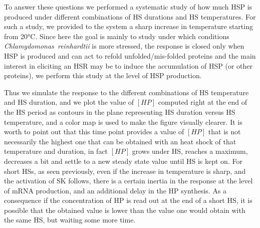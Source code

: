 \documentclass[oneside, 10pt, a4paper, twocolumn]{article}
\begin{document}
To answer these questions we performed a systematic study of how much HSP is produced under different combinations of HS durations and HS temperatures. 
For such a study, we provided to the system a sharp increase in temperature starting from 20°C. 
Since here the goal is mainly to study under which conditions \emph{Chlamydomonas~reinhardtii} is more stressed, the response is closed only when HSP is produced and can act to refold unfolded/mis-folded proteins and the main interest in eliciting an HSR may be to induce the accumulation of HSP (or other proteins), 
we perform this study at the level of HSP production. %

Thus we simulate the response to the different combinations of HS temperature and HS duration, and we plot the value of $\left[HP\right]$ computed right at the end of the HS period as contours in the {plane} representing HS duration versus HS temperature, and a color map is used to make the figure visually clearer. 
It is worth to point out that this time point provides a value of $\left[HP\right]$ that is not necessarily the highest one that can be obtained with an heat shock of that temperature and duration, in fact $\left[HP\right]$ grows under HS, reaches a maximum, decreases a bit and settle to a new steady state value until HS is kept on. %
For short HSs, as seen previously, even if the increase in temperature is sharp, and the activation of SK follows, there is a certain inertia in the response at the level of mRNA production, and an additional delay in the HP synthesis. As a consequence if the concentration of HP is read out at the end of a short HS, it is possible that the obtained value is lower than the value one would obtain with the same HS, but waiting some more time. %
\end{document}
